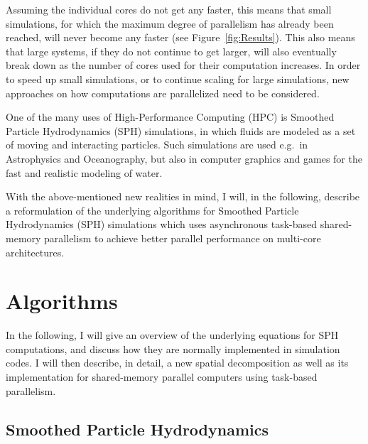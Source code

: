 \documentclass[final]{siamltex}
\newcommand{\fig}[1]
    {Figure~\ref{fig:#1}}
\begin{document}
Assuming the individual cores do not get any faster,
this means that small simulations, for which the
maximum degree of parallelism has already been reached, will never
become any faster (see \fig{Results}).
This also means that large systems, if they do not continue
to get larger, will also eventually break down as the number
of cores used for their computation increases.
In order to speed up small simulations, or to continue
scaling for large simulations, new approaches on how
computations are parallelized need to be considered.

One of the many uses of High-Performance Computing (HPC) is
Smoothed Particle Hydrodynamics (SPH) simulations, in which fluids
are modeled as a set of moving and interacting particles.
Such simulations are used e.g.~in Astrophysics and Oceanography,
but also in computer graphics and games for the fast and realistic
modeling of water.

With the above-mentioned new realities in mind, I will, in the following,
describe a reformulation of the
underlying algorithms for Smoothed Particle Hydrodynamics (SPH)
simulations which uses asynchronous
task-based shared-memory parallelism to achieve better parallel
performance on multi-core architectures.


\section{Algorithms}

In the following, I will give an overview of the underlying equations for
SPH computations, and discuss how they are normally implemented
in simulation codes.
I will then describe, in detail, a new spatial decomposition as well
as its implementation for shared-memory parallel computers using
task-based parallelism.

\subsection{Smoothed Particle Hydrodynamics}
\end{document}
